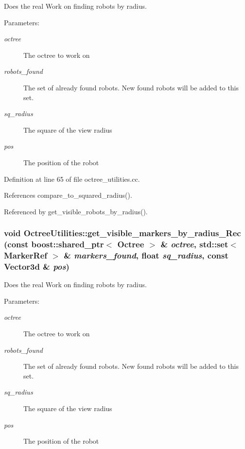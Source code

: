 Does the real Work on finding robots by radius.

\begin{Desc}
\item[Parameters:]
\begin{description}
\item[{\em octree}]The octree to work on \item[{\em robots\_\-found}]The set of already found robots. New found robots will be added to this set. \item[{\em sq\_\-radius}]The square of the view radius \item[{\em pos}]The position of the robot \end{description}
\end{Desc}


Definition at line 65 of file octree\_\-utilities.cc.

References compare\_\-to\_\-squared\_\-radius().

Referenced by get\_\-visible\_\-robots\_\-by\_\-radius().\hypertarget{class_octree_utilities_9067642270dc482ceee34c004af054b6}{
\subsubsection[get\_\-visible\_\-markers\_\-by\_\-radius\_\-Rec]{\setlength{\rightskip}{0pt plus 5cm}void OctreeUtilities::get\_\-visible\_\-markers\_\-by\_\-radius\_\-Rec (const boost::shared\_\-ptr$<$ {\bf Octree} $>$ \& {\em octree}, \/  std::set$<$ MarkerRef $>$ \& {\em markers\_\-found}, \/  float {\em sq\_\-radius}, \/  const Vector3d \& {\em pos})}}
\label{class_octree_utilities_9067642270dc482ceee34c004af054b6}


Does the real Work on finding robots by radius.

\begin{Desc}
\item[Parameters:]
\begin{description}
\item[{\em octree}]The octree to work on \item[{\em robots\_\-found}]The set of already found robots. New found robots will be added to this set. \item[{\em sq\_\-radius}]The square of the view radius \item[{\em pos}]The position of the robot \end{description}
\end{Desc}



